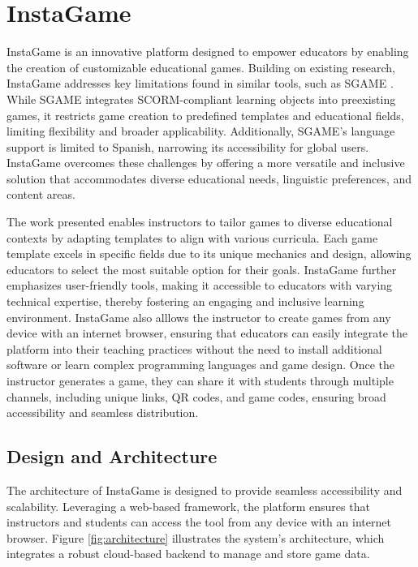 \chapter{InstaGame}\label{chap:method}


InstaGame is an innovative platform designed to empower educators by enabling the creation of customizable educational games. Building on existing research, InstaGame addresses key limitations found in similar tools, such as SGAME \cite{sgame2020}. While SGAME integrates SCORM-compliant learning objects into preexisting games, it restricts game creation to predefined templates and educational fields, limiting flexibility and broader applicability. Additionally, SGAME's language support is limited to Spanish, narrowing its accessibility for global users. InstaGame overcomes these challenges by offering a more versatile and inclusive solution that accommodates diverse educational needs, linguistic preferences, and content areas.

The work presented enables instructors to tailor games to diverse educational contexts by adapting templates to align with various curricula. Each game template excels in specific fields due to its unique mechanics and design, allowing educators to select the most suitable option for their goals. InstaGame further emphasizes user-friendly tools, making it accessible to educators with varying technical expertise, thereby fostering an engaging and inclusive learning environment. InstaGame also alllows the instructor to create games from any device with an internet browser, ensuring that educators can easily integrate the platform into their teaching practices without the need to install additional software or learn complex programming languages and game design. Once the instructor generates a game, they can share it with students through multiple channels, including unique links, QR codes, and game codes, ensuring broad accessibility and seamless distribution.

\section{Design and Architecture}

The architecture of InstaGame is designed to provide seamless accessibility and scalability. Leveraging a web-based framework, the platform ensures that instructors and students can access the tool from any device with an internet browser. Figure \ref{fig:architecture} illustrates the system’s architecture, which integrates a robust cloud-based backend to manage and store game data.


